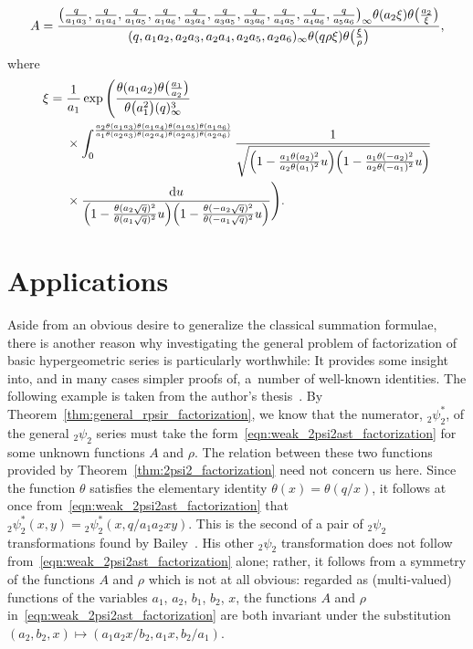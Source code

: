 \documentclass[pdftex]{sigma}
\numberwithin{equation}{section}
\newcommand{\dd}{\mathrm{d}}
\begin{document}
\begin{Remark}
\begin{itemize}
\[ A = {\bigl({q \over a_1a_3},{q \over a_1a_4},{q \over a_1a_5},{q \over a_1a_6},{q \over a_3a_4},{q \over a_3a_5},{q \over a_3a_6},{q \over a_4a_5},{q \over a_4a_6},{q \over a_5a_6}\bigr)_{ \infty} \theta(a_2\xi) \theta\bigl({a_2 \over \xi}\bigr) \over (q,a_1a_2,a_2a_3,a_2a_4,a_2a_5,a_2a_6)_{ \infty} \theta(q\rho\xi)\theta\bigl({\xi \over \rho}\bigr)} ,\]
where
\begin{align*}
\xi={}& {1 \over a_1}\exp \Bigg( {\theta(a_1a_2) \theta\bigl({a_1 \over a_2}\bigr) \over \theta\bigl(a_1^2\bigr) (q)_\infty^3} \\
&\times \int_0^{{a_2\theta(a_1a_3)\theta(a_1a_4)\theta(a_1a_5)\theta(a_1a_6) \over a_1\theta(a_2a_3)\theta(a_2a_4)\theta(a_2a_5)\theta(a_2a_6)}}\frac{1}{\sqrt{\Bigl(1-{a_1\theta(a_2)^2 \over a_2\theta(a_1)^2}u\Bigr) \Bigl(1-{a_1\theta(-a_2)^2 \over a_2\theta(-a_1)^2}u\Bigr)}} \\
&\times {\dd u \over \Bigl(1-{\theta(a_2\sqrt{q})^2 \over \theta(a_1\sqrt{q})^2}u\Bigr) \Bigl(1-{\theta(-a_2\sqrt{q})^2 \over \theta(-a_1\sqrt{q})^2}u\Bigr)} \Bigg).
\end{align*}
\end{itemize}
\end{Remark}

\section{Applications}

Aside from an obvious desire to generalize the classical summation formulae, there is another reason why investigating the general problem of factorization of basic hypergeometric series is particularly worthwhile: It provides some insight into, and in many cases simpler proofs of, a~number of well-known identities. The following example is taken from the author's thesis~\cite[Section~3.6]{Bradley-Thrush2023}. By Theorem~\ref{thm:general_rpsir_factorization}, we know that the numerator, $_2^{}\psi_2^\ast$, of the general $_2\psi_2$ series must take the form~\eqref{eqn:weak_2psi2ast_factorization} for some unknown functions $A$ and $\rho$. The relation between these two functions provided by Theorem~\ref{thm:2psi2_factorization} need not concern us here. Since the function $\theta$ satisfies the elementary identity $\theta(x) = \theta(q/x)$, it follows at once from~\eqref{eqn:weak_2psi2ast_factorization} that
${}_2^{}\psi_2^\ast(x,y) = {}_2^{}\psi_2^\ast(x,q/a_1a_2xy)$.
This is the second of a pair of $_2\psi_2$ transformations found by Bailey~\cite[equations~(2.3) and~(2.4)]{Bailey1950}. His other $_2\psi_2$ transformation does not follow from~\eqref{eqn:weak_2psi2ast_factorization} alone; rather, it follows from a symmetry of the functions $A$ and $\rho$ which is not at all obvious: regarded as (multi-valued) functions of the variables $a_1$, $a_2$, $b_1$, $b_2$, $x$, the functions $A$ and $\rho$ in~\eqref{eqn:weak_2psi2ast_factorization} are both invariant under the substitution $(a_2,b_2,x) \mapsto (a_1a_2x/b_2,a_1x,b_2/a_1)$.
\end{document}
